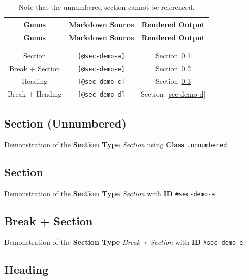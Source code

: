 \documentclass[
  10pt,
  oneside,
  cleardoublepage=empty,
  numbers=noenddot,
  titlepage,
  toclink=all,
  toc=bibliography,
  headinclude,
  footinclude]{scrbook}
\theoremstyle{plain}
\theoremstyle{plain}
\theoremstyle{definition}
\theoremstyle{definition}
\theoremstyle{plain}
\theoremstyle{plain}
\theoremstyle{definition}
\theoremstyle{plain}
\theoremstyle{remark}
\begin{document}
\begin{longtable}[]{@{}ccc@{}}
\toprule\noalign{}
\textbf{Genus} & \textbf{Markdown Source} & \textbf{Rendered Output} \\
\midrule\noalign{}
\endfirsthead
\toprule\noalign{}
\textbf{Genus} & \textbf{Markdown Source} & \textbf{Rendered Output} \\
\midrule\noalign{}
\endhead
\bottomrule\noalign{}
\tabularnewline
\caption{Note that the unnumbered section cannot be
referenced.}\label{tbl-sections}\tabularnewline
\endlastfoot
Section & \texttt{{[}@sec-demo-a{]}} &
\label{cite_63}{\label{cite_63}Section~\ref{sec-demo-a}} \\
Break + Section & \texttt{{[}@sec-demo-e{]}} &
\label{cite_64}{\label{cite_64}Section~\ref{sec-demo-e}} \\
Heading & \texttt{{[}@sec-demo-c{]}} &
\label{cite_65}{\label{cite_65}Section~\ref{sec-demo-c}} \\
Break + Heading & \texttt{{[}@sec-demo-d{]}} &
\label{cite_66}{\label{cite_66}Section~\ref{sec-demo-d}} \\
\end{longtable}

\subsection*{Section (Unnumbered)}\label{sec-demo-b}

Demonstration of the \textbf{Section Type} \emph{Section} using
\textbf{Class} \texttt{.unnumbered}.

\subsection{Section}\label{sec-demo-a}

Demonstration of the \textbf{Section Type} \emph{Section} with
\textbf{ID} \texttt{\#sec-demo-a}.

\newpage{}

\subsection{Break + Section}\label{sec-demo-e}

Demonstration of the \textbf{Section Type} \emph{Break + Section} with
\textbf{ID} \texttt{\#sec-demo-e}.

\subsection{Heading}\label{sec-demo-c}
\end{document}
